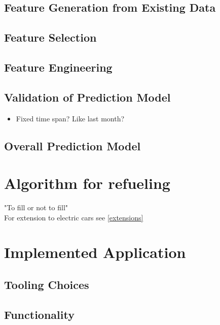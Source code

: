 \documentclass[%
a4paper,
DIV12,
2.5headlines,
bigheadings,
titlepage,
openbib,
]{scrartcl}
\begin{document}
\subsection{Feature Generation from Existing
Data}\label{feature-generation-from-existing-data}


\subsection{Feature Selection}\label{feature-selection}



\subsection{Feature Engineering}\label{feature-engineering}



\subsection{Validation of Prediction
Model}\label{validation-of-prediction-model}
\begin{itemize}
\item Fixed time span? Like last month?
\end{itemize}


\subsection{Overall Prediction Model}\label{overall-prediction-model}

\section{Algorithm for refueling}
"To fill or not to fill"\cite{khuller2007fill}\\
For extension to electric cars see \ref{extensions}

\section{Implemented Application}\label{implemented-application}
\subsection{Tooling Choices}\label{tooling-choices}



\subsection{Functionality}\label{functionality}
\end{document}
